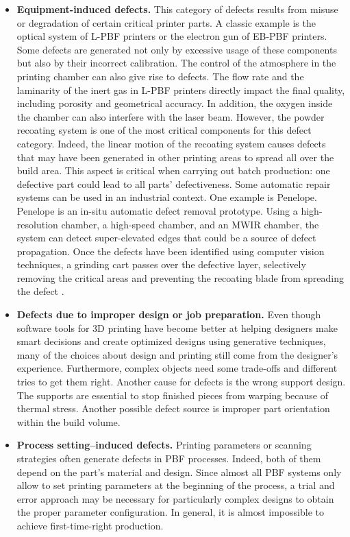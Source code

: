 \begin{itemize}
    \item \textbf{Equipment-induced defects.} This category of defects results from misuse or degradation of certain critical printer parts. A classic example is the optical system of L-PBF printers or the electron gun of EB-PBF printers. Some defects are generated not only by excessive usage of these components but also by their incorrect calibration. The control of the atmosphere in the printing chamber can also give rise to defects. The flow rate and the laminarity of the inert gas in L-PBF printers directly impact the final quality, including porosity and geometrical accuracy. In addition, the oxygen inside the chamber can also interfere with the laser beam. However, the powder recoating system is one of the most critical components for this defect category. Indeed, the linear motion of the recoating system causes defects that may have been generated in other printing areas to spread all over the build area. This aspect is critical when carrying out batch production: one defective part could lead to all parts' defectiveness. Some automatic repair systems can be used in an industrial context. One example is Penelope. Penelope is an in-situ automatic defect removal prototype. Using a high-resolution chamber, a high-speed chamber, and an MWIR chamber, the system can detect super-elevated edges that could be a source of defect propagation. Once the defects have been identified using computer vision techniques, a grinding cart passes over the defective layer, selectively removing the critical areas and preventing the recoating blade from spreading the defect \cite{colosimo_penelope_2020}.
    \item \textbf{Defects due to improper design or job preparation.} Even though software tools for 3D printing have become better at helping designers make smart decisions and create optimized designs using generative techniques, many of the choices about design and printing still come from the designer's experience. Furthermore, complex objects need some trade-offs and different tries to get them right. Another cause for defects is the wrong support design. The supports are essential to stop finished pieces from warping because of thermal stress. Another possible defect source is improper part orientation within the build volume. 
    \item \textbf{Process setting–induced defects.} Printing parameters or scanning strategies often generate defects in PBF processes. Indeed, both of them depend on the part's material and design. Since almost all PBF systems only allow to set printing parameters at the beginning of the process, a trial and error approach may be necessary for particularly complex designs to obtain the proper parameter configuration. In general, it is almost impossible to achieve first-time-right production.
\end{itemize}

